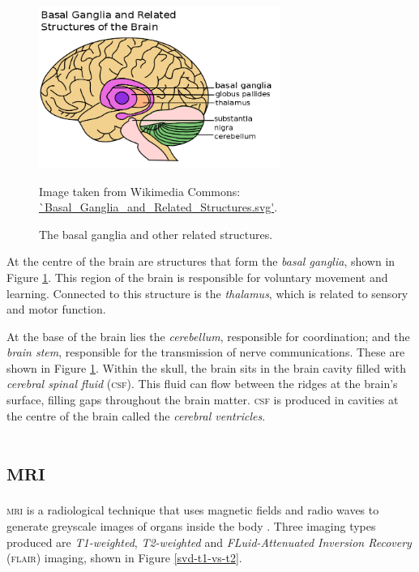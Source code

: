 \begin{figure}[ht]
	\centering
	\includegraphics[width=0.7\textwidth]{Images/2_Basal_Ganglia_and_Related_Structures.png}
	\caption{The basal ganglia and other related structures.}
	\small Image taken from Wikimedia Commons: \url{`Basal_Ganglia_and_Related_Structures.svg'}.
	\label{svd-basalfig}
\end{figure}

At the centre of the brain are structures that form the \textit{basal ganglia}, shown in Figure \ref{svd-basalfig}. This region of the brain is responsible for voluntary movement and learning. Connected to this structure is the \textit{thalamus}, which is related to sensory and motor function.

At the base of the brain lies the \textit{cerebellum}, responsible for coordination; and the \textit{brain stem}, responsible for the transmission of nerve communications. These are shown in Figure \ref{svd-basalfig}. Within the skull, the brain sits in the brain cavity filled with \textit{cerebral spinal fluid} (\textsc{csf}). This fluid can flow between the ridges at the brain's surface, filling gaps throughout the brain matter. \textsc{csf} is produced in cavities at the centre of the brain called the \textit{cerebral ventricles}.


\section{\textsc{mri}}\label{svd-MRI}

\textsc{mri} is a radiological technique that uses magnetic fields and radio waves to generate greyscale images of organs inside the body \cite{Rinck2013}. Three imaging types produced are \textit{T1-weighted}, \textit{T2-weighted} and \textit{FLuid-Attenuated Inversion Recovery} (\textsc{flair}) imaging, shown in Figure \ref{svd-t1-vs-t2}.

